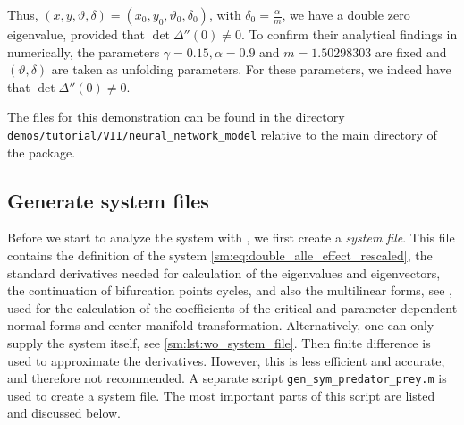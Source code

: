 Thus, $(x,y,\vartheta,\delta)=(x_0,y_0,\vartheta_0,\delta_0)$, with $\delta_0 =
\frac\alpha m$, we have a double zero eigenvalue, provided that
$\det\Delta''(0) \neq 0$. To confirm their analytical findings in \cite{Jiao2021}
numerically, the parameters $\gamma=0.15,\alpha=0.9$ and $m=1.50298303$ are
fixed and $(\vartheta,\delta)$ are taken as unfolding parameters. For these
parameters, we indeed have that $\det\Delta''(0) \neq 0$.

\begin{remark}
    The \MATLAB files for this demonstration can be found in the directory
    \texttt{demos/tutorial/VII/neural_network_model} relative to the main
    directory of the \DDEBIFTOOL package.
\end{remark}

\subsection{Generate system files}
Before we start to analyze the system with \DDEBIFTOOL, we first create a
\emph{system file}. This file contains the definition of the system
\cref{sm:eq:double_alle_effect_rescaled}, the standard derivatives needed for
calculation of the eigenvalues and eigenvectors, the continuation of
bifurcation points cycles, and also the multilinear forms, see \cite[Section
6]{Switching2019}, used for the calculation of the coefficients of the critical
and parameter-dependent normal forms and center manifold transformation.
Alternatively, one can only supply the system itself, see
\cref{sm:lst:wo_system_file}. Then finite difference is used to approximate the
derivatives. However, this is less efficient and accurate, and therefore not
recommended. A separate script \texttt{gen_sym_predator_prey.m} is used to
create a system file. The most important parts of this script are listed and
discussed below.

